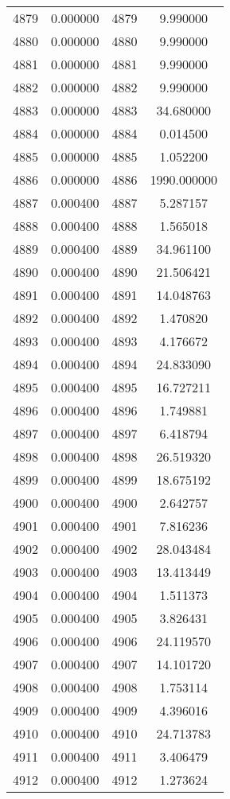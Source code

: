 \documentclass[12pt]{article}
\begin{document}
\begin{longtable}{@{}cccc@{}}
4879 & 0.000000 & 4879 & 9.990000 \\
4880 & 0.000000 & 4880 & 9.990000 \\
4881 & 0.000000 & 4881 & 9.990000 \\
4882 & 0.000000 & 4882 & 9.990000 \\
4883 & 0.000000 & 4883 & 34.680000 \\
4884 & 0.000000 & 4884 & 0.014500 \\
4885 & 0.000000 & 4885 & 1.052200 \\
4886 & 0.000000 & 4886 & 1990.000000 \\
4887 & 0.000400 & 4887 & 5.287157 \\
4888 & 0.000400 & 4888 & 1.565018 \\
4889 & 0.000400 & 4889 & 34.961100 \\
4890 & 0.000400 & 4890 & 21.506421 \\
4891 & 0.000400 & 4891 & 14.048763 \\
4892 & 0.000400 & 4892 & 1.470820 \\
4893 & 0.000400 & 4893 & 4.176672 \\
4894 & 0.000400 & 4894 & 24.833090 \\
4895 & 0.000400 & 4895 & 16.727211 \\
4896 & 0.000400 & 4896 & 1.749881 \\
4897 & 0.000400 & 4897 & 6.418794 \\
4898 & 0.000400 & 4898 & 26.519320 \\
4899 & 0.000400 & 4899 & 18.675192 \\
4900 & 0.000400 & 4900 & 2.642757 \\
4901 & 0.000400 & 4901 & 7.816236 \\
4902 & 0.000400 & 4902 & 28.043484 \\
4903 & 0.000400 & 4903 & 13.413449 \\
4904 & 0.000400 & 4904 & 1.511373 \\
4905 & 0.000400 & 4905 & 3.826431 \\
4906 & 0.000400 & 4906 & 24.119570 \\
4907 & 0.000400 & 4907 & 14.101720 \\
4908 & 0.000400 & 4908 & 1.753114 \\
4909 & 0.000400 & 4909 & 4.396016 \\
4910 & 0.000400 & 4910 & 24.713783 \\
4911 & 0.000400 & 4911 & 3.406479 \\
4912 & 0.000400 & 4912 & 1.273624 \\

\end{longtable}
\end{document}
